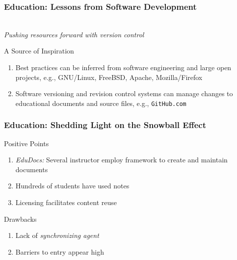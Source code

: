 \documentclass{beamer}
\begin{document}
\begin{frame}
  \frametitle{Education: Lessons from Software Development}

  \begin{center}
  \scalebox{0.5}{} \\
  \emph{Pushing resources forward with version control}
  \end{center}
  \begin{block}{A Source of Inspiration}
    \begin{enumerate}
    \item Best practices can be inferred from software engineering and large open projects, e.g., GNU/Linux, FreeBSD, Apache, Mozilla/Firefox
    \item Software versioning and revision control systems can manage changes to educational documents and source files, e.g., \texttt{GitHub.com}
    \end{enumerate}
  \end{block}
\end{frame}

\begin{frame}
  \frametitle{Education: Shedding Light on the Snowball Effect}

  \begin{block}{Positive Points}
    \begin{enumerate}
    \item \emph{EduDocs:} Several instructor employ framework to create and maintain documents
    \item Hundreds of students have used notes
    \item Licensing facilitates content reuse
    \end{enumerate}
  \end{block}
  \vfill
  \begin{block}{Drawbacks}
    \begin{enumerate}
    \item Lack of \emph{synchronizing agent}
    \item Barriers to entry appear high
    \end{enumerate}
  \end{block}
\end{frame}
\end{document}
